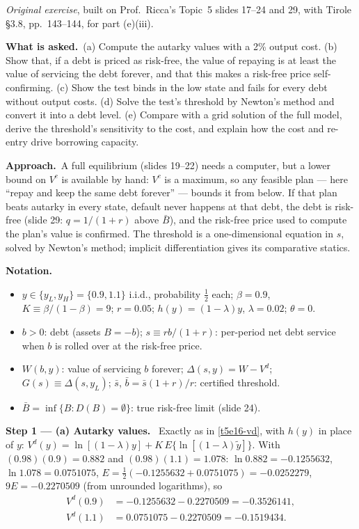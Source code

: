 \documentclass[11pt,a4paper]{article}
\newcommand{\notation}{\par\noindent\textbf{Notation.}}
\newcommand{\step}[2]{\par\medskip\noindent\textbf{Step #1 --- #2.}~}
\newcommand{\asked}{\par\medskip\noindent\textbf{What is asked.}~}
\newcommand{\approach}{\par\smallskip\noindent\textbf{Approach.}~}
\begin{document}
\noindent\emph{Original exercise}, built on Prof.\ Ricca's Topic~5 slides 17--24 and 29, with Tirole \S3.8, pp.~143--144, for part (e)(iii).

\asked (a) Compute the autarky values with a 2\% output cost. (b) Show that, if a debt is priced as risk-free, the value of repaying is at least the value of
servicing the debt forever, and that this makes a risk-free price self-confirming. (c) Show the test binds in the low state and fails for every debt without
output costs. (d) Solve the test's threshold by Newton's method and convert it into a debt level. (e) Compare with a grid solution of the full model, derive
the threshold's sensitivity to the cost, and explain how the cost and re-entry drive borrowing capacity.

\approach A full equilibrium (slides 19--22) needs a computer, but a lower bound on $V^c$ is available by hand: $V^c$ is a maximum, so any feasible plan
--- here ``repay and keep the same debt forever'' --- bounds it from below. If that plan beats autarky in every state, default never happens at that debt,
the debt is risk-free (slide 29: $q=1/(1+r)$ above $\bar B$), and the risk-free price used to compute the plan's value is confirmed. The threshold is a
one-dimensional equation in $s$, solved by Newton's method; implicit differentiation gives its comparative statics.

\notation
\begin{itemize}
  \item $y\in\{y_L,y_H\}=\{0.9,1.1\}$ i.i.d., probability $\tfrac12$ each; $\beta=0.9$, $K\equiv\beta/(1-\beta)=9$; $r=0.05$; $h(y)=(1-\lambda)y$, $\lambda=0.02$; $\theta=0$.
  \item $b>0$: debt (assets $B=-b$); $s\equiv rb/(1+r)$: per-period net debt service when $b$ is rolled over at the risk-free price.
  \item $W(b,y)$: value of servicing $b$ forever; $\Delta(s,y)=W-V^d$; $G(s)\equiv\Delta(s,y_L)$; $\bar s$, $\bar b=\bar s(1+r)/r$: certified threshold.
  \item $\bar B=\inf\{B:D(B)=\emptyset\}$: true risk-free limit (slide 24).
\end{itemize}

\step{1}{(a) Autarky values} Exactly as in \eqref{t5e16-vd}, with $h(y)$ in place of $y$: $V^d(y)=\ln[(1-\lambda)y]+K\,E\{\ln[(1-\lambda)\tilde y]\}$. With $(0.98)(0.9)=0.882$ and
$(0.98)(1.1)=1.078$: $\ln0.882=-0.1255632$, $\ln1.078=0.0751075$, $E=\tfrac12(-0.1255632+0.0751075)=-0.0252279$, $9E=-0.2270509$ (from unrounded logarithms), so
\begin{align}
  V^d(0.9) &= -0.1255632-0.2270509 = -0.3526141, \nonumber\\
  V^d(1.1) &= 0.0751075-0.2270509 = -0.1519434. \nonumber
\end{align}
\end{document}
